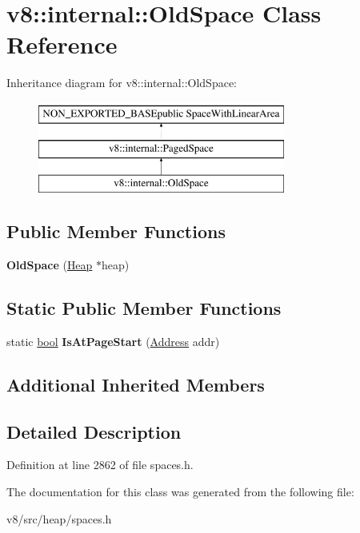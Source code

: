 \hypertarget{classv8_1_1internal_1_1OldSpace}{}\section{v8\+:\+:internal\+:\+:Old\+Space Class Reference}
\label{classv8_1_1internal_1_1OldSpace}
Inheritance diagram for v8\+:\+:internal\+:\+:Old\+Space\+:\begin{figure}[H]
\begin{center}
\leavevmode
\includegraphics[height=3.000000cm]{classv8_1_1internal_1_1OldSpace}
\end{center}
\end{figure}
\subsection*{Public Member Functions}
\begin{DoxyCompactItemize}
\item 
\mbox{\label{classv8_1_1internal_1_1OldSpace_add2f03587ce0606c9f49bc2e4e32119b}} 
{\bfseries Old\+Space} (\mbox{\hyperlink{classv8_1_1internal_1_1Heap}{Heap}} $\ast$heap)
\end{DoxyCompactItemize}
\subsection*{Static Public Member Functions}
\begin{DoxyCompactItemize}
\item 
\mbox{\label{classv8_1_1internal_1_1OldSpace_a50b19173e9e0580059af9c9b9d5e4321}} 
static \mbox{\hyperlink{classbool}{bool}} {\bfseries Is\+At\+Page\+Start} (\mbox{\hyperlink{classuintptr__t}{Address}} addr)
\end{DoxyCompactItemize}
\subsection*{Additional Inherited Members}


\subsection{Detailed Description}


Definition at line 2862 of file spaces.\+h.



The documentation for this class was generated from the following file\+:\begin{DoxyCompactItemize}
\item 
v8/src/heap/spaces.\+h\end{DoxyCompactItemize}
